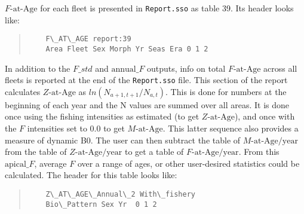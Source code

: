 

$F\text{-at-Age}$ for each fleet is presented in \texttt{Report.sso} as table 39. Its header looks like:
\begin{quote}
	\begin{verbatim}
	F\_AT\_AGE report:39
	Area Fleet Sex Morph Yr Seas Era 0 1 2
	\end{verbatim}
\end{quote}

In addition to the $F\_std$ and $\text{annual\_}F$ outputs, info on total $F\text{-at-Age}$ across all fleets is reported at the end of the \texttt{Report.sso} file. This section of the report calculates $Z\text{-at-Age}$ as $ln(N_{a+1,t+1}/N_{a,t})$. This is done for numbers at the beginning of each year and the N values are summed over all areas. It is done once using the fishing intensities as estimated (to get $Z\text{-at-Age}$), and once with the $F$ intensities set to 0.0 to get $M\text{-at-Age}$. This latter sequence also provides a measure of dynamic B0. The user can then subtract the table of $M\text{-at-Age/year}$ from the table of $Z\text{-at-Age/year}$ to get a table of $F\text{-at-Age/year}$. From this $\text{apical\_}F$, average $F$ over a range of ages, or other user-desired statistics could be calculated. The header for this table looks like:
\begin{quote}
	\begin{verbatim}
	Z\_AT\_AGE\_Annual\_2 With\_fishery
	Bio\_Pattern Sex Yr  0 1 2
	\end{verbatim}
\end{quote}


